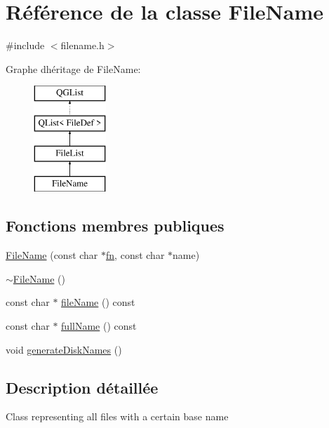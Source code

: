 \hypertarget{class_file_name}{}\section{Référence de la classe File\+Name}
\label{class_file_name}


{\ttfamily \#include $<$filename.\+h$>$}

Graphe d\textquotesingle{}héritage de File\+Name\+:\begin{figure}[H]
\begin{center}
\leavevmode
\includegraphics[height=4.000000cm]{class_file_name}
\end{center}
\end{figure}
\subsection*{Fonctions membres publiques}
\begin{DoxyCompactItemize}
\item 
\hyperlink{class_file_name_aff3bb1609a0d4be83b2d63e6c0327bd6}{File\+Name} (const char $\ast$\hyperlink{tclscanner_8cpp_a9ffad97216456d27984aacce395adf85}{fn}, const char $\ast$name)
\item 
\hyperlink{class_file_name_ac9f453451f1614f486909bce40e731f0}{$\sim$\+File\+Name} ()
\item 
const char $\ast$ \hyperlink{class_file_name_a0cb2a45849aa59a67f1a9c9afc361332}{file\+Name} () const 
\item 
const char $\ast$ \hyperlink{class_file_name_aade29f384a6781b7b2c1a439ae9369b2}{full\+Name} () const 
\item 
void \hyperlink{class_file_name_a156ef6131a30d885cf63d239a1a0263b}{generate\+Disk\+Names} ()
\end{DoxyCompactItemize}


\subsection{Description détaillée}
Class representing all files with a certain base name 

